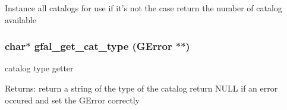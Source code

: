 Instance all catalogs for use if it's not the case return the number of catalog available 
\subsubsection{\setlength{\rightskip}{0pt plus 5cm}char$\ast$ gfal\_\-get\_\-cat\_\-type (GError $\ast$$\ast$)}\label{gfal__common__catalog_8h_791ad55a9c8aaca0bb8ae74a3538c202}


catalog type getter 

\begin{Desc}
\item[Returns:]return a string of the type of the catalog return NULL if an error occured and set the GError correctly \end{Desc}
